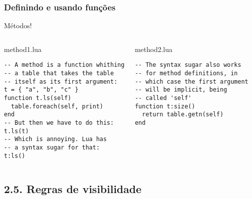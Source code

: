 \documentclass[brazil]{beamer}
\begin{document}

\begin{frame}[fragile]
  \frametitle{Definindo e usando funções}
  \pause
  \begin{center}
    Métodos!
  \end{center}
  \pause
  \begin{columns}
      \begin{block}{method1.lua}
        \begin{lstlisting}
-- A method is a function whithing
-- a table that takes the table
-- itself as its first argument:
t = { "a", "b", "c" }
function t.ls(self)
  table.foreach(self, print)
end
-- But then we have to do this:
t.ls(t)
-- Which is annoying. Lua has
-- a syntax sugar for that:
t:ls()
        \end{lstlisting}
      \end{block}
    \pause
      \begin{block}{method2.lua}
        \begin{lstlisting}
-- The syntax sugar also works
-- for method definitions, in
-- which case the first argument
-- will be implicit, being
-- called 'self'
function t:size()
  return table.getn(self)
end
        \end{lstlisting}
      \end{block}
  \end{columns}
\end{frame}

\subsection{2.5. Regras de visibilidade}

\end{document}
